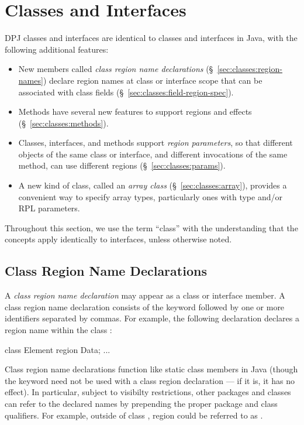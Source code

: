 \section{Classes and Interfaces%
\label{sec:classes}}

DPJ classes and interfaces are identical to classes and interfaces in
Java, with the following additional features:
%
\begin{itemize}
%
\item New members called \emph{class region name declarations}
  (\S~\ref{sec:classes:region-names}) declare region names at class or
  interface scope that can be associated with class fields
  (\S~\ref{sec:classes:field-region-spec}).
%
\item Methods have several new features to support regions and effects
  (\S~\ref{sec:classes:methods}).
%
\item Classes, interfaces, and methods support \emph{region
  parameters}, so that different objects of the same class or
  interface, and different invocations of the same method, can use
  different regions (\S~\ref{sec:classes:params}).
%
\item A new kind of class, called an \emph{array class}
  (\S~\ref{sec:classes:array}), provides a convenient way to specify
  array types, particularly ones with type and/or RPL parameters.
%
\end{itemize}
%
Throughout this section, we use the term ``class'' with the
understanding that the concepts apply identically to interfaces,
unless otherwise noted.

\subsection{Class Region Name Declarations%
\label{sec:classes:region-names}}

A \emph{class region name declaration} may appear as a class or
interface member.  A class region name declaration consists of the
keyword  followed by one or more identifiers separated by
commas. For example, the following declaration declares a region name
 within the class :

\begin{dpjlisting}
class Element {
  region Data;
  ...
}
\end{dpjlisting}

Class region name declarations function like static class members in
Java (though the keyword  need not be used with a class
region declaration --- if it is, it has no effect).  In particular,
subject to visibilty restrictions, other packages and classes can
refer to the declared names by prepending the proper package and class
qualifiers.  For example, outside of class , region
 could be referred to as .

